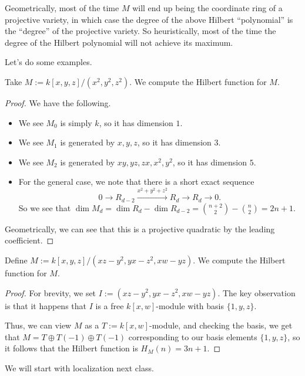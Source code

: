 \begin{remark}
	Geometrically, most of the time $M$ will end up being the coordinate ring of a projective variety, in which case the degree of the above Hilbert ``polynomial'' is the ``degree'' of the projective variety. So heuristically, most of the time the degree of the Hilbert polynomial will not achieve its maximum.
\end{remark}
Let's do some examples.
\begin{exe}
	Take $M:=k[x,y,z]/\left(x^2,y^2,z^2\right)$. We compute the Hilbert function for $M$.
\end{exe}
\begin{proof}
	We have the following.
	\begin{itemize}
		\item We see $M_0$ is simply $k$, so it has dimension $1$.
		\item We see $M_1$ is generated by $x,y,z$, so it has dimension $3$.
		\item We see $M_2$ is generated by $xy,yz,zx,x^2,y^2$, so it has dimension $5$.
		\item For the general case, we note that there is a short exact sequence
		\[0\to R_{d-2}\stackrel{x^2+y^2+z^2}\to R_d\to R_d\to0.\]
		So we see that $\dim M_d=\dim R_d-\dim R_{d-2}=\binom{n+2}2-\binom n2=2n+1$.
	\end{itemize}
	Geometrically, we can see that this is a projective quadratic by the leading coefficient.
\end{proof}
\begin{exe}[Eisenbud 1.19]
	Define $M:=k[x,y,z]/\left(xz-y^2,yx-z^2,xw-yz\right)$. We compute the Hilbert function for $M$.
\end{exe}
\begin{proof}
	For brevity, we set $I:=\left(xz-y^2,yx-z^2,xw-yz\right)$. The key observation is that it happens that\todo{} $I$ is a free $k[x,w]$-module with basis $\{1,y,z\}$.

	Thus, we can view $M$ as a $T:=k[x,w]$-module, and checking the basis, we get that $M=T\oplus T(-1)\oplus T(-1)$ corresponding to our basis elements $\{1,y,z\}$, so it follows that the Hilbert function is $H_M(n)=3n+1$.
\end{proof}
We will start with localization next class.